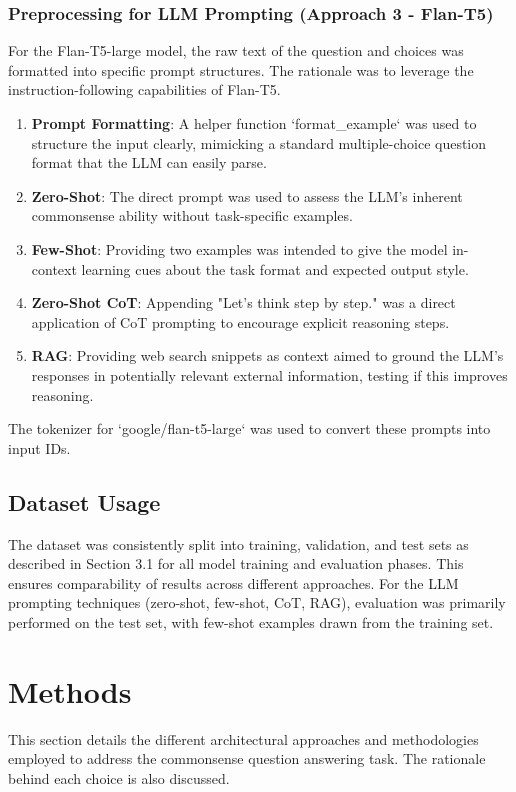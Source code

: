 \documentclass[10.5pt]{article}
\begin{document}
\subsubsection{Preprocessing for LLM Prompting (Approach 3 - Flan-T5)}
For the Flan-T5-large model, the raw text of the question and choices was formatted into specific prompt structures. The rationale was to leverage the instruction-following capabilities of Flan-T5.
\begin{enumerate}
    \item \textbf{Prompt Formatting}: A helper function `format\_example` was used to structure the input clearly, mimicking a standard multiple-choice question format that the LLM can easily parse.
    \item \textbf{Zero-Shot}: The direct prompt was used to assess the LLM's inherent commonsense ability without task-specific examples.
    \item \textbf{Few-Shot}: Providing two examples was intended to give the model in-context learning cues about the task format and expected output style.
    \item \textbf{Zero-Shot CoT}: Appending "Let's think step by step." was a direct application of CoT prompting to encourage explicit reasoning steps.
    \item \textbf{RAG}: Providing web search snippets as context aimed to ground the LLM's responses in potentially relevant external information, testing if this improves reasoning.
\end{enumerate}
The tokenizer for `google/flan-t5-large` was used to convert these prompts into input IDs.

\subsection{Dataset Usage}
The dataset was consistently split into training, validation, and test sets as described in Section 3.1 for all model training and evaluation phases. This ensures comparability of results across different approaches. For the LLM prompting techniques (zero-shot, few-shot, CoT, RAG), evaluation was primarily performed on the test set, with few-shot examples drawn from the training set.

\newpage
\section{Methods}
This section details the different architectural approaches and methodologies employed to address the commonsense question answering task. The rationale behind each choice is also discussed.
\end{document}
